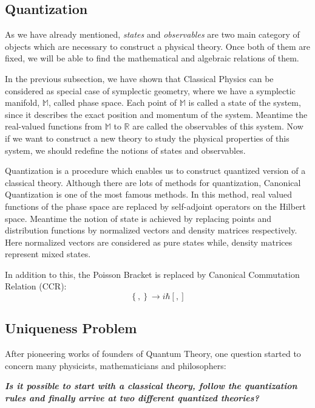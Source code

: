 \documentclass[12pt,a4paper]{article}
\begin{document}
\subsection{Quantization}\label{Quant}
As we have already mentioned, \emph{states} and \emph{observables} are two main category of objects which are necessary to construct a physical theory. Once both of them are fixed, we will be able to find the mathematical and algebraic relations of them.

In the previous subsection, we have shown that Classical Physics can be considered as special case of symplectic geometry, where we have a symplectic manifold, $\mathbb{M}$, called phase space. Each point of $\mathbb{M}$ is called a state of the system, since it describes the exact position and momentum of the system. Meantime the real-valued functions from $\mathbb{M}$ to $\mathbb{R}$ are called the observables of this system. Now if we want to construct a new theory to study the physical properties of this system, we should redefine the notions of states and observables.

Quantization is a procedure which enables us to construct quantized version of a classical theory. Although there are lots of methods for quantization, Canonical Quantization is one of the most famous methods. In this method, real valued functions of the phase space are replaced by self-adjoint operators on the Hilbert space. Meantime the notion of state is achieved by replacing points and distribution functions by normalized vectors and density matrices respectively. Here normalized vectors are considered as pure states while, density matrices represent mixed states.

In addition to this, the Poisson Bracket is replaced by Canonical Commutation Relation (CCR):
\begin{equation}\label{Poisson 3}
 \left\{ ,\right\}\rightarrow i\hbar \left[ , \right]
\end{equation}

\subsection{Uniqueness Problem }\label{subsecgtion.von Neumann}

After pioneering works of founders of Quantum Theory, one question started to concern many physicists, mathematicians and philosophers:

\emph{\textbf{Is it possible to start with a classical theory, follow the quantization rules and finally arrive at two different quantized theories? }}
\end{document}
